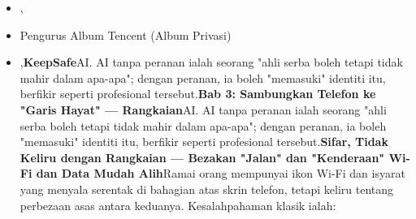 \begin{itemize}
  \item ,
  \item Pengurus Album Tencent (Album Privasi)
  \item ,\textbf{KeepSafe}AI. AI tanpa peranan ialah seorang "ahli serba boleh tetapi tidak mahir dalam apa-apa"; dengan peranan, ia boleh "memasuki" identiti itu, berfikir seperti profesional tersebut.\textbf{Bab 3: Sambungkan Telefon ke "Garis Hayat" — Rangkaian}AI. AI tanpa peranan ialah seorang "ahli serba boleh tetapi tidak mahir dalam apa-apa"; dengan peranan, ia boleh "memasuki" identiti itu, berfikir seperti profesional tersebut.\textbf{Sifar, Tidak Keliru dengan Rangkaian — Bezakan "Jalan" dan "Kenderaan" Wi-Fi dan Data Mudah Alih}Ramai orang mempunyai ikon Wi-Fi dan isyarat yang menyala serentak di bahagian atas skrin telefon, tetapi keliru tentang perbezaan asas antara keduanya. Kesalahpahaman klasik ialah:
\end{itemize}

